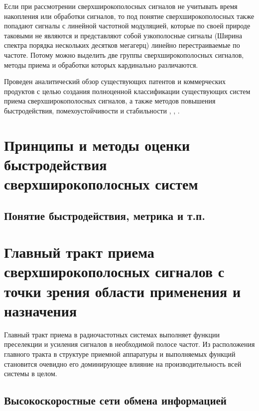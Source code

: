 Если при рассмотрении сверхширокополосных сигналов не учитывать время накопления или обработки сигналов, то под понятие сверхширокополосных также попадают сигналы с линейной частотной модуляцией, которые по своей природе таковыми не являются и представляют собой узкополосные сигналы (Ширина спектра порядка нескольких десятков мегагерц) линейно перестраиваемые по частоте. Потому можно выделить две группы сверхширокополосных сигналов, методы приема и обработки которых кардинально различаются.

Проведен аналитический обзор существующих патентов и коммерческих продуктов с целью создания полноценной классификации существующих систем приема сверхширокополосных сигналов, а также методов повышения быстродействия, помехоустойчивости и стабильности \cite{jia_4-bit_2020}, \cite{cheng_introduction_2021, lin_60-ghz_nodate, gray_analysis_2009}, \cite{nagulu_ultra-wideband_2021, rahimpour_design_2019, rucker_013m_2009, pelgrom_matching_1989-1, du_112-gss_2019, hartmann_low-power_2007, saha_6-20_2012, johansen_analysis_2005, shahramian_millimeter-wave_2011, du_256-gss_2018, dyskin_wideband_2016, noauthor_photonic_nodate, noauthor_microwave_2005}.

\section{Принципы и методы оценки быстродействия сверхширокополосных систем}

\subsection{Понятие быстродействия, метрика и т.п.}

\section{Главный тракт приема сверхширокополосных сигналов с точки зрения области применения и назначения}
Главный тракт приема в радиочастотных системах выполняет функции преселекции и усиления сигналов в необходимой полосе частот. Из расположения главного тракта в структуре приемной аппаратуры и выполняемых функций становится очевидно его доминирующее влияние на производительность всей системы в целом.

\subsection{Высокоскоростные сети обмена информацией}

